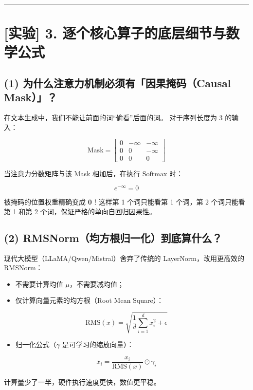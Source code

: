 \vspace{0.8em}\hrule\vspace{0.8em}

\section{[实验] 3. 逐个核心算子的底层细节与数学公式}

\subsection{(1) 为什么注意力机制必须有「因果掩码（Causal Mask）」？}

在文本生成中，我们不能让前面的词“偷看”后面的词。
对于序列长度为 3 的输入：

\[
\text{Mask} = \begin{bmatrix}
0 & -\infty & -\infty \\
0 & 0 & -\infty \\
0 & 0 & 0
\end{bmatrix}
\]

当注意力分数矩阵与该 Mask 相加后，在执行 $\text{Softmax}$ 时：

\[
e^{-\infty} = 0
\]

被掩码的位置权重精确变成 \textbf{0}！这样第 1 个词只能看第 1 个词，第 2 个词只能看第 1 和第 2 个词，保证严格的单向自回归因果性。

\subsection{(2) RMSNorm（均方根归一化）到底算什么？}

现代大模型（LLaMA/Qwen/Mistral）舍弃了传统的 LayerNorm，改用更高效的 RMSNorm：
\begin{itemize}
  \item 不需要计算均值 $\mu$，不需要减均值；
  \item 仅计算向量元素的均方根（Root Mean Square）：
\end{itemize}

\[
\text{RMS}(x) = \sqrt{\frac{1}{d} \sum_{i=1}^{d} x_i^2 + \epsilon}
\]

\begin{itemize}
  \item 归一化公式（$\gamma$ 是可学习的缩放向量）：
\end{itemize}

\[
\bar{x}_i = \frac{x_i}{\text{RMS}(x)} \odot \gamma_i
\]

计算量少了一半，硬件执行速度更快，数值更平稳。

